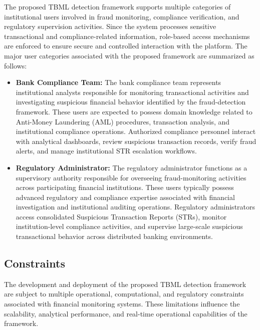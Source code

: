 The proposed TBML detection framework supports multiple categories of institutional users involved in fraud monitoring, compliance verification, and regulatory supervision activities. Since the system processes sensitive transactional and compliance-related information, role-based access mechanisms are enforced to ensure secure and controlled interaction with the platform. The major user categories associated with the proposed framework are summarized as follows:

\begin{itemize}

\item \textbf{Bank Compliance Team:}  
The bank compliance team represents institutional analysts responsible for monitoring transactional activities and investigating suspicious financial behavior identified by the fraud-detection framework. These users are expected to possess domain knowledge related to Anti-Money Laundering (AML) procedures, transaction analysis, and institutional compliance operations. Authorized compliance personnel interact with analytical dashboards, review suspicious transaction records, verify fraud alerts, and manage institutional STR escalation workflows.

\item \textbf{Regulatory Administrator:}  
The regulatory administrator functions as a supervisory authority responsible for overseeing fraud-monitoring activities across participating financial institutions. These users typically possess advanced regulatory and compliance expertise associated with financial investigation and institutional auditing operations. Regulatory administrators access consolidated Suspicious Transaction Reports (STRs), monitor institution-level compliance activities, and supervise large-scale suspicious transactional behavior across distributed banking environments.

\end{itemize}




\subsection[Constraints]{\textbf{Constraints}}

The development and deployment of the proposed TBML detection framework are subject to multiple operational, computational, and regulatory constraints associated with financial monitoring systems. These limitations influence the scalability, analytical performance, and real-time operational capabilities of the framework.

